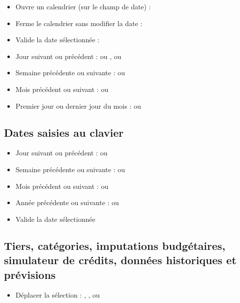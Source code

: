 \begin{itemize}
	\item Ouvre un calendrier (sur le champ de date) : 
	\item Ferme le calendrier sans modifier la date : 
	\item Valide la date sélectionnée : 
	\item Jour suivant ou précédent : \key{+} ou \key{-},  ou 
	\item Semaine précédente ou suivante :  ou 
	\item Mois précédent ou suivant :  ou 
	\item Premier jour ou dernier jour du mois :  ou 
\end{itemize}


\subsection{Dates saisies au clavier}

\begin{itemize}
	\item Jour suivant ou précédent : \key{+} ou \key{-}
	\item Semaine précédente ou suivante :  \key{+} ou  \key{-}
	\item Mois précédent ou suivant :  ou 
	\item Année précédente ou suivante :   ou  
	\item Valide la date sélectionnée 
\end{itemize}


\subsection{Tiers, catégories, imputations budgétaires, simulateur de crédits, données historiques et prévisions}

\begin{itemize}
	\item Déplacer la sélection : , ,  ou 
\end{itemize}


